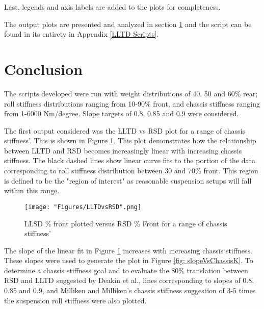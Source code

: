 \documentclass[a4paper]{article}
\numberwithin{equation}{section}
\begin{document}
Last, legends and axis labels are added to the plots for completeness.

The output plots are presented and analyzed in section \ref{Conclusion} and the script can be found in its entirety in Appendix \ref{LLTD Scripts}.

\section{Conclusion} \label{Conclusion}
The scripts developed were run with weight distributions of 40, 50 and 60\% rear; roll stiffness distributions ranging from 10-90\% front, and chassis stiffness ranging from 1-6000 Nm/degree. Slope targets of 0.8, 0.85 and 0.9 were considered.

The first output considered was the LLTD vs RSD plot for a range of chassis stiffness'. This is shown in Figure \ref{fig: LLTDvsRSD}. This plot demonstrates how the relationship between LLTD and RSD becomes increasingly linear with increasing chassis stiffness. The black dashed lines show linear curve fits to the portion of the data corresponding to roll stiffness distribution between 30 and 70\% front. This region is defined to be the "region of interest" as reasonable suspension setups will fall within this range.

\begin{figure}[h]
	\begin{center}
		\texttt{[image: "Figures/LLTDvsRSD".png]}
	\end{center}
	
	\caption{LLSD \% front plotted versus RSD \% Front for a range of chassis stiffness'}
	\label{fig: LLTDvsRSD}
\end{figure}

The slope of the linear fit in Figure \ref{fig: LLTDvsRSD} increases with increasing chassis stiffness. These slopes were used to generate the plot in Figure \ref{fig: slopeVsChassisK}. To determine a chassis stiffness goal and to evaluate the 80\% translation between RSD and LLTD suggested by Deakin et al., lines corresponding to slopes of 0.8, 0.85 and 0.9, and Milliken and Milliken's chassis stiffness suggestion of 3-5 times the suspension roll stiffness were also plotted. 
\end{document}
